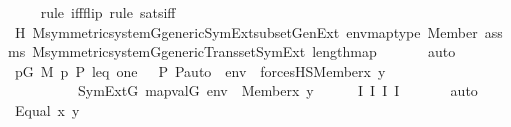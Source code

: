 \begin{isabellebody}
\ \ \ \ \isamarkupfalse%
{\isacharparenleft}{\kern0pt}rule\ iff{\isacharunderscore}{\kern0pt}flip{\isacharcomma}{\kern0pt}\ rule\ {\isasymDelta}{}{\isacharunderscore}{\kern0pt}sats{\isacharunderscore}{\kern0pt}iff{\isacharparenright}{\kern0pt}\isanewline
\ \ \ \ \isamarkupfalse%
\ H\ M{\isacharunderscore}{\kern0pt}symmetric{\isacharunderscore}{\kern0pt}system{\isacharunderscore}{\kern0pt}G{\isacharunderscore}{\kern0pt}generic{\isachardot}{\kern0pt}SymExt{\isacharunderscore}{\kern0pt}subset{\isacharunderscore}{\kern0pt}GenExt\ envmaptype\ Member{\isacharunderscore}{\kern0pt}{\isasymDelta}{}\ assms{}\ M{\isacharunderscore}{\kern0pt}symmetric{\isacharunderscore}{\kern0pt}system{\isacharunderscore}{\kern0pt}G{\isacharunderscore}{\kern0pt}generic{\isachardot}{\kern0pt}Transset{\isacharunderscore}{\kern0pt}SymExt\ length{\isacharunderscore}{\kern0pt}map\ \isanewline
\ \ \ \ \isamarkupfalse%
\ auto\isanewline
\ \ \isamarkupfalse%
\ {\isachardoublequoteopen}{\isacharparenleft}{\kern0pt}{\isasymexists}p{\isasymin}G{\isachardot}{\kern0pt}\ M{\isacharcomma}{\kern0pt}\ {\isacharbrackleft}{\kern0pt}p{\isacharcomma}{\kern0pt}\ P{\isacharcomma}{\kern0pt}\ leq{\isacharcomma}{\kern0pt}\ one{\isacharcomma}{\kern0pt}\ {\isasymlangle}{\isasymF}{\isacharcomma}{\kern0pt}\ {\isasymG}{\isacharcomma}{\kern0pt}\ P{\isacharcomma}{\kern0pt}\ P{\isacharunderscore}{\kern0pt}auto{\isasymrangle}{\isacharbrackright}{\kern0pt}\ {\isacharat}{\kern0pt}\ env\ {\isasymTurnstile}\ forcesHS{\isacharparenleft}{\kern0pt}Member{\isacharparenleft}{\kern0pt}x{\isacharcomma}{\kern0pt}\ y{\isacharparenright}{\kern0pt}{\isacharparenright}{\kern0pt}{\isacharparenright}{\kern0pt}\ {\isasymlongleftrightarrow}\isanewline
\ \ \ \ \ \ \ \ \ \ SymExt{\isacharparenleft}{\kern0pt}G{\isacharparenright}{\kern0pt}{\isacharcomma}{\kern0pt}\ map{\isacharparenleft}{\kern0pt}val{\isacharparenleft}{\kern0pt}G{\isacharparenright}{\kern0pt}{\isacharcomma}{\kern0pt}\ env{\isacharparenright}{\kern0pt}\ {\isasymTurnstile}\ Member{\isacharparenleft}{\kern0pt}x{\isacharcomma}{\kern0pt}\ y{\isacharparenright}{\kern0pt}{\isachardoublequoteclose}\isanewline
\ \ \ \ \isamarkupfalse%
\ I{}\ I{}\ I{}\ I{}\ \isanewline
\ \ \ \ \isamarkupfalse%
\ auto\isanewline
\isanewline
{}\isamarkupfalse%
\isanewline
\ \ \isamarkupfalse%
\ {\isacharparenleft}{\kern0pt}Equal\ x\ y{\isacharparenright}{\kern0pt}\isanewline
\ \ \isamarkupfalse%

\end{isabellebody}
